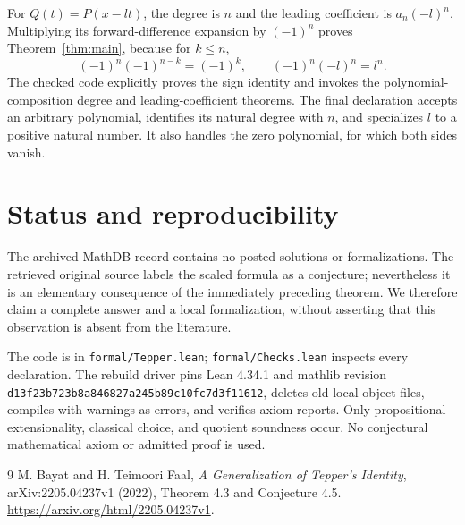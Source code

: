 \documentclass[11pt]{article}
\begin{document}
For $Q(t)=P(x-lt)$, the degree is $n$ and the leading coefficient is $a_n(-l)^n$. Multiplying its forward-difference expansion by $(-1)^n$ proves Theorem~\ref{thm:main}, because for $k\le n$,
\[
(-1)^n(-1)^{n-k}=(-1)^k,\qquad (-1)^n(-l)^n=l^n.
\]
The checked code explicitly proves the sign identity and invokes the polynomial-composition degree and leading-coefficient theorems. The final declaration accepts an arbitrary polynomial, identifies its natural degree with $n$, and specializes $l$ to a positive natural number. It also handles the zero polynomial, for which both sides vanish.
\section{Status and reproducibility}
The archived MathDB record contains no posted solutions or formalizations. The retrieved original source labels the scaled formula as a conjecture; nevertheless it is an elementary consequence of the immediately preceding theorem. We therefore claim a complete answer and a local formalization, without asserting that this observation is absent from the literature.

The code is in \texttt{formal/Tepper.lean}; \texttt{formal/Checks.lean} inspects every declaration. The rebuild driver pins Lean 4.34.1 and mathlib revision \texttt{d13f23b723b8a846827a245b89c10fc7d3f11612}, deletes old local object files, compiles with warnings as errors, and verifies axiom reports. Only propositional extensionality, classical choice, and quotient soundness occur. No conjectural mathematical axiom or admitted proof is used.
\begin{thebibliography}{9}
 M. Bayat and H. Teimoori Faal, \emph{A Generalization of Tepper's Identity}, arXiv:2205.04237v1 (2022), Theorem 4.3 and Conjecture 4.5. \url{https://arxiv.org/html/2205.04237v1}.
\end{thebibliography}
\end{document}
